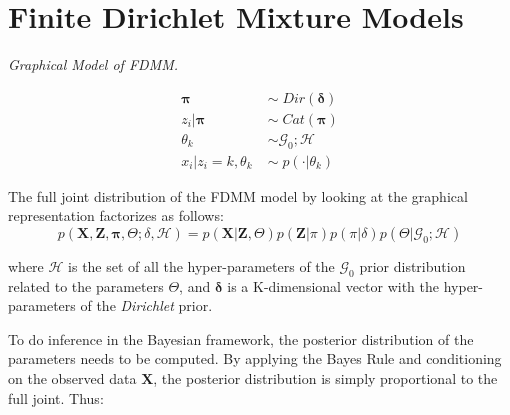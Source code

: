 \section{Finite Dirichlet Mixture Models} \label{fdmm-s}

\begin{minipage}{0.6\textwidth}%
  \hfill
  \begin{center}
	
	\emph{Graphical Model of FDMM.}
  \end{center}
\end{minipage}
\begin{minipage}{0.1\textwidth}%
  \begin{equation*}
  	\begin{aligned}
  		\mathbf{\pi} \; & \sim \; Dir(\mathbf{\delta}) \\
  		z_{i}|\mathbf{\pi} \; & \sim \; Cat(\mathbf{\pi}) \\
  		\theta_{k} \; & \sim \mathcal{G}_{0}; \mathcal{H} \\
  		x_{i}|z_{i}=k,\theta_{k} \; & \sim \; p(\cdot | \theta_{k})  
  	\end{aligned} 
  \end{equation*} 
\end{minipage}

\vspace*{5mm}
The full joint distribution of the FDMM model by looking at the graphical representation factorizes as follows:
\begin{equation}%
	p(\mathbf{X},\mathbf{Z},\mathbf{\pi},\Theta;\delta,\mathcal{H}) = p(\mathbf{X}|\mathbf{Z},\Theta) p(\mathbf{Z}|\pi) p(\pi|\delta) p(\Theta |\mathcal{G}_{0}; \mathcal{H})
\end{equation}

where $\mathcal{H}$ is the set of all the hyper-parameters of the $\mathcal{G}_{0}$ prior distribution related to the parameters $\Theta$, and $\mathbf{\delta}$ is a K-dimensional vector with the hyper-parameters of the \emph{Dirichlet} prior. 

To do inference in the Bayesian framework, the posterior distribution of the parameters needs to be computed. By applying the Bayes Rule and conditioning on the observed data $\mathbf{X}$, the posterior distribution is simply proportional to the full joint. Thus:
 
